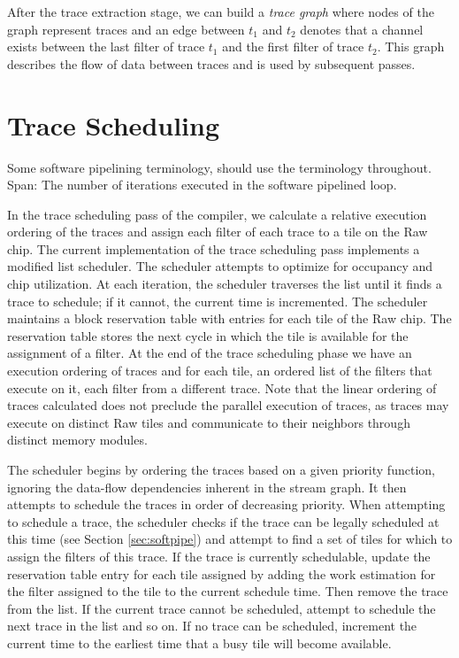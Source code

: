 After the trace extraction stage, we can build a {\it trace graph}
where nodes of the graph represent traces and an edge between $t_1$
and $t_2$ denotes that a channel exists between the last filter of
trace $t_1$ and the first filter of trace $t_2$. This graph describes
the flow of data between traces and is used by subsequent passes.

\section{Trace Scheduling}
Some software pipelining terminology, should use the terminology
throughout. 
Span:  The number of iterations executed in the software pipelined
loop.


\label{sec:scheduling}
In the trace scheduling pass of the compiler, we calculate a relative
execution ordering of the traces and assign each filter of each trace
to a tile on the Raw chip.  The current implementation of the trace
scheduling pass implements a modified list scheduler. The scheduler
attempts to optimize for occupancy and chip utilization.  At each
iteration, the scheduler traverses the list until it finds a trace to
schedule; if it cannot, the current time is incremented.  The
scheduler maintains a block reservation table with entries for each
tile of the Raw chip.  The reservation table stores the next cycle in
which the tile is available for the assignment of a filter.  At the
end of the trace scheduling phase we have an execution ordering of
traces and for each tile, an ordered list of the filters that execute
on it, each filter from a different trace. Note that the linear
ordering of traces calculated does not preclude the parallel execution
of traces, as traces may execute on distinct Raw tiles and communicate
to their neighbors through distinct memory modules.

The scheduler begins by ordering the traces based on a given priority
function, ignoring the data-flow dependencies inherent in the stream
graph.  It then attempts to schedule the traces in order of decreasing
priority.  When attempting to schedule a trace, the scheduler checks
if the trace can be legally scheduled at this time (see Section
\ref{sec:softpipe}) and attempt to find a set of tiles for which to
assign the filters of this trace. If the trace is currently
schedulable, update the reservation table entry for each tile assigned
by adding the work estimation for the filter assigned to the tile to
the current schedule time. Then remove the trace from the list.  If
the current trace cannot be scheduled, attempt to schedule the next
trace in the list and so on.  If no trace can be scheduled, increment
the current time to the earliest time that a busy tile will become
available.

